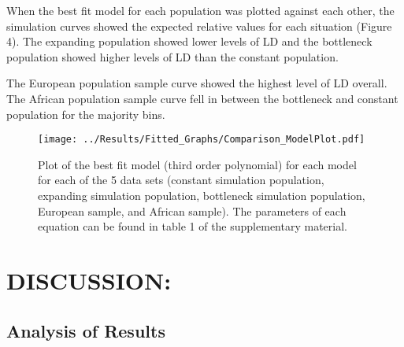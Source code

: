 \documentclass[11pt]{article}
\begin{document}
\begin{linenumbers}
\begin{table}[htp]
\begin{tabular}{c  c  c}
\end{tabular}
\end{table}

When the best fit model for each population was plotted against each other, the simulation curves showed the expected relative values for each situation (Figure 4). The expanding population showed lower levels of LD and the bottleneck population showed higher levels of LD than the constant population. 

The European population sample curve showed the highest level of LD overall. The African population sample curve fell in between the bottleneck and constant population for the majority bins. 


\begin{figure}[htp]
\begin{center}
\texttt{[image: ../Results/Fitted\_Graphs/Comparison\_ModelPlot.pdf]}
\caption{\small Plot of the best fit model (third order polynomial) for each model for each of the 5 data sets (constant simulation population, expanding simulation population, bottleneck simulation population, European sample, and African sample). The parameters of each equation can be found in table 1 of the supplementary material.}
\end{center}
\end{figure}

\newpage
\section{DISCUSSION:}

\subsection{Analysis of Results}


\end{linenumbers}
\end{document}
